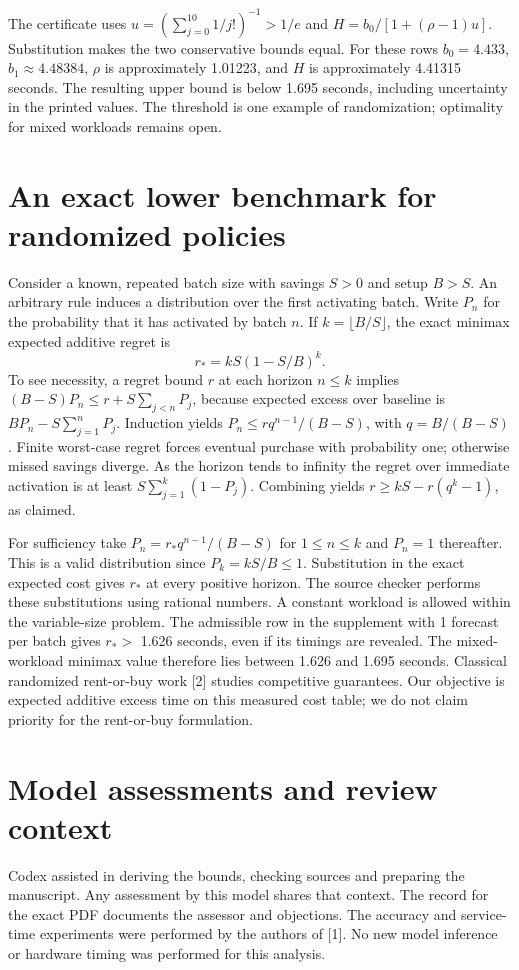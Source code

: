 \documentclass[11pt]{article}
\begin{document}
The certificate uses $u=(\sum_{j=0}^{10}1/j!)^{-1}>1/e$ and $H=b_0/[1+(\rho-1)u]$. Substitution makes the two conservative bounds equal. For these rows $b_0=4.433$, $b_1\approx 4.48384$, $\rho$ is approximately 1.01223, and $H$ is approximately 4.41315 seconds. The resulting upper bound is below 1.695 seconds, including uncertainty in the printed values. The threshold is one example of randomization; optimality for mixed workloads remains open.

\section{An exact lower benchmark for randomized policies}
Consider a known, repeated batch size with savings $S>0$ and setup $B>S$. An arbitrary rule induces a distribution over the first activating batch. Write $P_n$ for the probability that it has activated by batch $n$. If $k=\lfloor B/S\rfloor$, the exact minimax expected additive regret is
\[
 r_* = kS(1-S/B)^k .
\]
To see necessity, a regret bound $r$ at each horizon $n\le k$ implies $(B-S)P_n\le r+S\sum_{j<n}P_j$, because expected excess over baseline is $BP_n-S\sum_{j=1}^nP_j$. Induction yields $P_n\le r q^{n-1}/(B-S)$, with $q=B/(B-S)$. Finite worst-case regret forces eventual purchase with probability one; otherwise missed savings diverge. As the horizon tends to infinity the regret over immediate activation is at least $S\sum_{j=1}^k(1-P_j)$. Combining yields $r\ge kS-r(q^k-1)$, as claimed.

For sufficiency take $P_n=r_*q^{n-1}/(B-S)$ for $1\le n\le k$ and $P_n=1$ thereafter. This is a valid distribution since $P_k=kS/B\le1$. Substitution in the exact expected cost gives $r_*$ at every positive horizon. The source checker performs these substitutions using rational numbers. A constant workload is allowed within the variable-size problem. The admissible row in the supplement with 1 forecast per batch gives $r_* >$ 1.626 seconds, even if its timings are revealed. The mixed-workload minimax value therefore lies between 1.626 and 1.695 seconds. Classical randomized rent-or-buy work [2] studies competitive guarantees. Our objective is expected additive excess time on this measured cost table; we do not claim priority for the rent-or-buy formulation.

\section*{Model assessments and review context}
Codex assisted in deriving the bounds, checking sources and preparing the manuscript. Any assessment by this model shares that context. The record for the exact PDF documents the assessor and objections. The accuracy and service-time experiments were performed by the authors of [1]. No new model inference or hardware timing was performed for this analysis.
\end{document}
